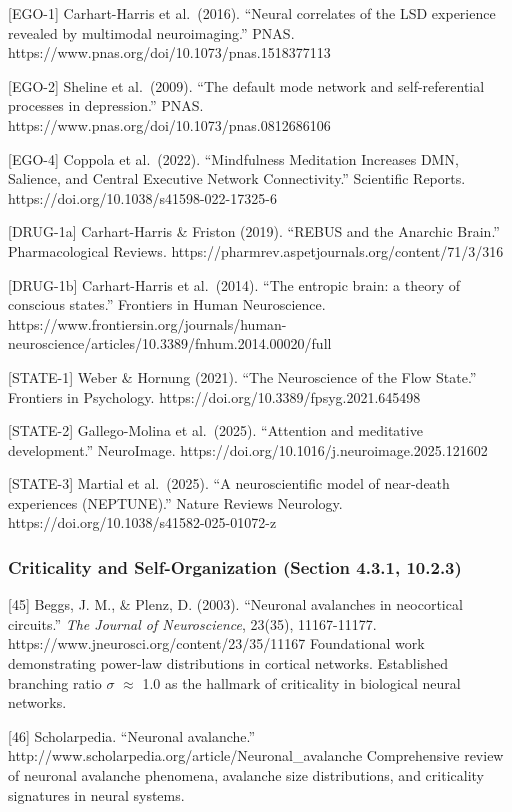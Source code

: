 \documentclass[
]{article}
\begin{document}
{[}EGO-1{]} Carhart-Harris et al.~(2016). ``Neural correlates of the LSD
experience revealed by multimodal neuroimaging.'' PNAS.
https://www.pnas.org/doi/10.1073/pnas.1518377113

{[}EGO-2{]} Sheline et al.~(2009). ``The default mode network and
self-referential processes in depression.'' PNAS.
https://www.pnas.org/doi/10.1073/pnas.0812686106

{[}EGO-4{]} Coppola et al.~(2022). ``Mindfulness Meditation Increases
DMN, Salience, and Central Executive Network Connectivity.'' Scientific
Reports. https://doi.org/10.1038/s41598-022-17325-6

{[}DRUG-1a{]} Carhart-Harris \& Friston (2019). ``REBUS and the Anarchic
Brain.'' Pharmacological Reviews.
https://pharmrev.aspetjournals.org/content/71/3/316

{[}DRUG-1b{]} Carhart-Harris et al.~(2014). ``The entropic brain: a
theory of conscious states.'' Frontiers in Human Neuroscience.
https://www.frontiersin.org/journals/human-neuroscience/articles/10.3389/fnhum.2014.00020/full

{[}STATE-1{]} Weber \& Hornung (2021). ``The Neuroscience of the Flow
State.'' Frontiers in Psychology.
https://doi.org/10.3389/fpsyg.2021.645498

{[}STATE-2{]} Gallego-Molina et al.~(2025). ``Attention and meditative
development.'' NeuroImage.
https://doi.org/10.1016/j.neuroimage.2025.121602

{[}STATE-3{]} Martial et al.~(2025). ``A neuroscientific model of
near-death experiences (NEPTUNE).'' Nature Reviews Neurology.
https://doi.org/10.1038/s41582-025-01072-z

\hypertarget{criticality-and-self-organization-section-4.3.1-10.2.3}{%
\subsubsection{Criticality and Self-Organization (Section 4.3.1,
10.2.3)}\label{criticality-and-self-organization-section-4.3.1-10.2.3}}

{[}45{]} Beggs, J. M., \& Plenz, D. (2003). ``Neuronal avalanches in
neocortical circuits.'' \emph{The Journal of Neuroscience}, 23(35),
11167-11177. https://www.jneurosci.org/content/23/35/11167 Foundational
work demonstrating power-law distributions in cortical networks.
Established branching ratio $\sigma$ $\approx$ 1.0 as the hallmark of criticality in
biological neural networks.

{[}46{]} Scholarpedia. ``Neuronal avalanche.''
http://www.scholarpedia.org/article/Neuronal\_avalanche Comprehensive
review of neuronal avalanche phenomena, avalanche size distributions,
and criticality signatures in neural systems.
\end{document}
